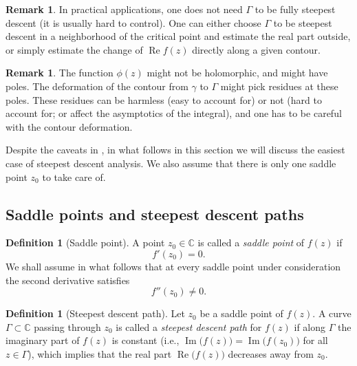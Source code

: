 \documentclass[letterpaper,11pt,oneside,reqno]{article}
\numberwithin{equation}{section}
\theoremstyle{definition}
\newtheorem{definition}[proposition]{Definition}
\newtheorem{remark}[proposition]{Remark}
\begin{document}
\begin{remark}
	\label{rem:steepest-descent}
	In practical applications, one does not
	need $\Gamma$ to be fully steepest descent (it is usually hard to control).
	One can either choose $\Gamma$ to be steepest descent
	in a neighborhood of the critical point and estimate the real part outside,
	or simply estimate the change of $\operatorname{Re}f(z)$ directly along a given contour.
\end{remark}

\begin{remark}
	\label{rem:residues}
	The function $\phi(z)$ might not be holomorphic, and might have poles. The
	deformation of the contour from $\gamma$ to $\Gamma$ might pick residues
	at these poles. These residues can be harmless (easy to account for) or
	not (hard to account for; or affect the asymptotics of the integral),
	and one has to be careful with the contour deformation.
\end{remark}

Despite the caveats in ,
in what follows in this section we will discuss the
easiest case of steepest descent analysis.
We also assume that there is only one saddle point $z_0$
to take care of.

\subsection{Saddle points and steepest descent paths}

\begin{definition}[Saddle point]
	A point $z_0\in\mathbb{C}$ is called a \emph{saddle point} of $f(z)$ if
	\[
		f'(z_0)=0.
	\]
	We shall assume in what follows that at every saddle point under consideration the second derivative satisfies
	\[
		f''(z_0)\neq 0.
	\]
\end{definition}

\begin{definition}[Steepest descent path]
	Let $z_0$ be a saddle point of $f(z)$. A curve $\Gamma\subset\mathbb{C}$ passing through $z_0$ is called a \emph{steepest descent path} for $f(z)$ if along $\Gamma$ the imaginary part of $f(z)$ is constant (i.e.,
	\(
		\operatorname{Im}\bigl(f(z)\bigr)=\operatorname{Im}\bigl(f(z_0)\bigr)
	\)
	for all $z\in\Gamma$), which implies that the real part
	$\operatorname{Re}\bigl(f(z)\bigr)$ decreases away from
	$z_0$.
\end{definition}
\end{document}
